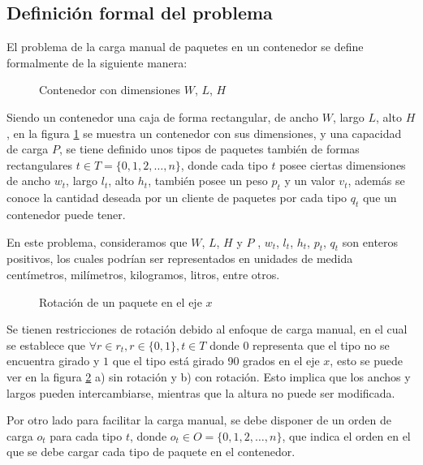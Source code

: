 \subsection{Definición formal del problema}

El problema de la carga manual de paquetes en un contenedor se define formalmente de la siguiente manera:

\begin{figure}[H]
    \centering
    
    \caption{Contenedor con dimensiones $W$, $L$, $H$}
    \label{fig:container}
\end{figure}

Siendo un contenedor una caja de forma rectangular, de ancho $W$, largo $L$, alto $H$, en la figura \ref{fig:container} se muestra un contenedor con sus dimensiones, y una capacidad de carga $P$, se tiene definido unos tipos de paquetes también de formas rectangulares $t \in T = \{0, 1, 2, \ldots, n\}$, donde cada tipo $t$ posee ciertas dimensiones de ancho $w_t$, largo $l_t$, alto $h_t$, también posee un peso $p_t$ y un valor $v_t$, además se conoce la cantidad deseada por un cliente de paquetes por cada tipo $q_t$ que un contenedor puede tener.

En este problema, consideramos que $W$, $L$, $H$ y $P$ , $w_t$, $l_t$, $h_t$, $p_t$, $q_t$ son enteros positivos, los cuales podrían ser representados en unidades de medida centímetros, milímetros, kilogramos, litros, entre otros.

\begin{figure}[H]
    \centering
    
    \caption{Rotación de un paquete en el eje $x$}
    \label{fig:rotation}
\end{figure}

Se tienen restricciones de rotación debido al enfoque de carga manual, en el cual se establece que $\forall r \in r_t, r \in \{0, 1\}, t \in T$ donde $0$ representa que el tipo no se encuentra girado y $1$ que el tipo está girado 90 grados en el eje $x$, esto se puede ver en la figura \ref{fig:rotation} a) sin rotación y b) con rotación. Esto implica que los anchos y largos pueden intercambiarse, mientras que la altura no puede ser modificada.

Por otro lado para facilitar la carga manual, se debe disponer de un orden de carga $o_t$ para cada tipo $t$, donde $o_t \in O = \{0, 1, 2, \ldots, n\}$, que indica el orden en el que se debe cargar cada tipo de paquete en el contenedor.

